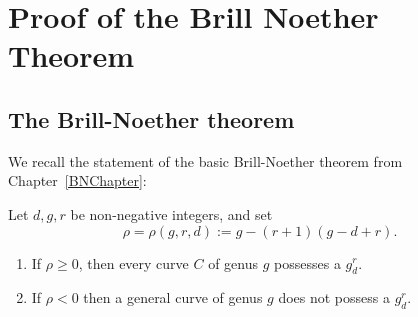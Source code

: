 

\chapter{Proof of the Brill Noether Theorem}\label{Brill Noether proof chapter}
\label{BrillNoetherproofChapter}


\section{The Brill-Noether theorem}

We recall the statement of the basic Brill-Noether theorem from Chapter~\ref{BNChapter}:

\begin{theorem}\label{basic Brill Noether}
Let $d,g,r$ be non-negative integers, and set 
$$
\rho =\rho(g,r,d) := g - (r+1)(g-d+r).
$$
 \begin{enumerate}
\item If $\rho \geq 0$, then every curve $C$ of genus $g$ possesses a $g^r_d$.
\item If $\rho < 0$ then a general curve of genus $g$ does not possess a $g^r_d$.
\end{enumerate}
\end{theorem}


